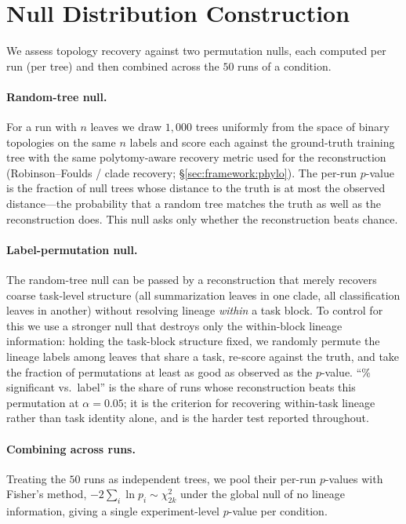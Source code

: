\documentclass{article}
\theoremstyle{definition}
\theoremstyle{plain}
\begin{document}
\section{Null Distribution Construction}
\label{app:null}

We assess topology recovery against two permutation nulls, each computed per run (per tree) and then
combined across the $50$ runs of a condition.

\paragraph{Random-tree null.} For a run with $n$ leaves we draw $1{,}000$ trees uniformly from the space
of binary topologies on the same $n$ labels and score each against the ground-truth training tree with
the same polytomy-aware recovery metric used for the reconstruction (Robinson--Foulds / clade
recovery; \S\ref{sec:framework:phylo}). The per-run $p$-value is the fraction of null trees whose
distance to the truth is at most the observed distance---the probability that a random tree matches the
truth as well as the reconstruction does. This null asks only whether the reconstruction beats chance.

\paragraph{Label-permutation null.} The random-tree null can be passed by a reconstruction that merely
recovers coarse task-level structure (all summarization leaves in one clade, all classification leaves
in another) without resolving lineage \emph{within} a task block. To control for this we use a stronger
null that destroys only the within-block lineage information: holding the task-block structure fixed, we
randomly permute the lineage labels among leaves that share a task, re-score against the truth, and take
the fraction of permutations at least as good as observed as the $p$-value. ``\% significant vs.\
label'' is the share of runs whose reconstruction beats this permutation at $\alpha=0.05$; it is the
criterion for recovering within-task lineage rather than task identity alone, and is the harder test
reported throughout.

\paragraph{Combining across runs.} Treating the $50$ runs as independent trees, we pool their per-run
$p$-values with Fisher's method, $-2\sum_{i}\ln p_i \sim \chi^2_{2k}$ under the global null of no lineage
information, giving a single experiment-level $p$-value per condition.
\end{document}

